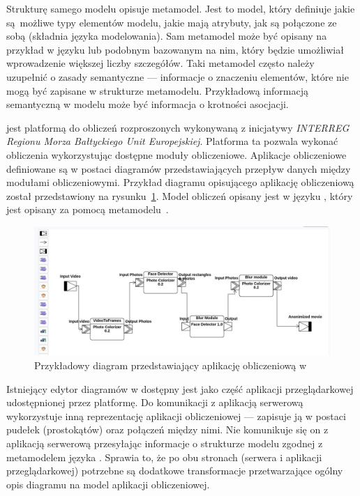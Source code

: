 Strukturę samego modelu opisuje metamodel. Jest to model, który definiuje jakie
są~możliwe typy elementów modelu, jakie mają atrybuty, jak są połączone ze
sobą (składnia języka modelowania). Sam metamodel może być opisany na przykład
w języku  lub podobnym
bazowanym na nim, który będzie umożliwiał wprowadzenie większej liczby
szczegółów. Taki metamodel często należy uzupełnić o zasady semantyczne ---
informacje o znaczeniu elementów, które nie mogą być zapisane w strukturze
metamodelu.
Przykładową informacją semantyczną w modelu  może być
informacja o krotności asocjacji.

\BalticLSC{} jest platformą do obliczeń rozproszonych wykonywaną z
inicjatywy
\emph{INTERREG Regionu Morza Bałtyckiego Unit Europejskiej}. Platforma ta
pozwala
wykonać obliczenia wykorzystując dostępne moduły obliczeniowe. Aplikacje
obliczeniowe definiowane są w postaci diagramów przedstawiających przepływ
danych między modułami obliczeniowymi. Przykład diagramu opisującego aplikację
obliczeniową został przedstawiony na
rysunku~\ref{rys:przykladowy-diagram-balticlsc}.  Model obliczeń opisany jest w
języku , który jest opisany za pomocą
metamodelu~\cite{cal-metamodel}.

\begin{figure}[!ht]
	\centering

	\includegraphics[width=0.95\linewidth]{./images/balticlsc-example-diagram.png}
	\caption{Przykładowy diagram przedstawiający aplikację obliczeniową w
		\BalticLSC{}}\label{rys:przykladowy-diagram-balticlsc}
\end{figure}

Istniejący edytor diagramów w \BalticLSC{} dostępny jest jako część aplikacji
przeglądarkowej udostępnionej przez platformę. Do komunikacji z aplikacją
serwerową wykorzystuje inną reprezentację aplikacji obliczeniowej --- zapisuje
ją w postaci pudełek (prostokątów) oraz połączeń między nimi. Nie komunikuje
się on z aplikacją serwerową przesyłając informacje o strukturze modelu
zgodnej z metamodelem języka \CAL{}. Sprawia to, że po obu stronach (serwera
i aplikacji przeglądarkowej) potrzebne są dodatkowe transformacje
przetwarzające ogólny opis diagramu na model aplikacji obliczeniowej.


